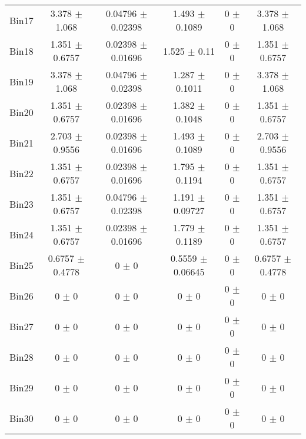 \begin{tabular}{@{\extracolsep{4pt}}lccccc@{}}
     Bin17 & 3.378 $\pm$ 1.068 & 0.04796 $\pm$ 0.02398 & 1.493 $\pm$ 0.1089 & 0 $\pm$ 0 & 3.378 $\pm$ 1.068 \\ 
     Bin18 & 1.351 $\pm$ 0.6757 & 0.02398 $\pm$ 0.01696 & 1.525 $\pm$ 0.11 & 0 $\pm$ 0 & 1.351 $\pm$ 0.6757 \\ 
     Bin19 & 3.378 $\pm$ 1.068 & 0.04796 $\pm$ 0.02398 & 1.287 $\pm$ 0.1011 & 0 $\pm$ 0 & 3.378 $\pm$ 1.068 \\ 
     Bin20 & 1.351 $\pm$ 0.6757 & 0.02398 $\pm$ 0.01696 & 1.382 $\pm$ 0.1048 & 0 $\pm$ 0 & 1.351 $\pm$ 0.6757 \\ 
     Bin21 & 2.703 $\pm$ 0.9556 & 0.02398 $\pm$ 0.01696 & 1.493 $\pm$ 0.1089 & 0 $\pm$ 0 & 2.703 $\pm$ 0.9556 \\ 
     Bin22 & 1.351 $\pm$ 0.6757 & 0.02398 $\pm$ 0.01696 & 1.795 $\pm$ 0.1194 & 0 $\pm$ 0 & 1.351 $\pm$ 0.6757 \\ 
     Bin23 & 1.351 $\pm$ 0.6757 & 0.04796 $\pm$ 0.02398 & 1.191 $\pm$ 0.09727 & 0 $\pm$ 0 & 1.351 $\pm$ 0.6757 \\ 
     Bin24 & 1.351 $\pm$ 0.6757 & 0.02398 $\pm$ 0.01696 & 1.779 $\pm$ 0.1189 & 0 $\pm$ 0 & 1.351 $\pm$ 0.6757 \\ 
     Bin25 & 0.6757 $\pm$ 0.4778 & 0 $\pm$ 0 & 0.5559 $\pm$ 0.06645 & 0 $\pm$ 0 & 0.6757 $\pm$ 0.4778 \\ 
     Bin26 & 0 $\pm$ 0 & 0 $\pm$ 0 & 0 $\pm$ 0 & 0 $\pm$ 0 & 0 $\pm$ 0 \\ 
     Bin27 & 0 $\pm$ 0 & 0 $\pm$ 0 & 0 $\pm$ 0 & 0 $\pm$ 0 & 0 $\pm$ 0 \\ 
     Bin28 & 0 $\pm$ 0 & 0 $\pm$ 0 & 0 $\pm$ 0 & 0 $\pm$ 0 & 0 $\pm$ 0 \\ 
     Bin29 & 0 $\pm$ 0 & 0 $\pm$ 0 & 0 $\pm$ 0 & 0 $\pm$ 0 & 0 $\pm$ 0 \\ 
     Bin30 & 0 $\pm$ 0 & 0 $\pm$ 0 & 0 $\pm$ 0 & 0 $\pm$ 0 & 0 $\pm$ 0 \\ 
\hline\hline
  \end{tabular}
